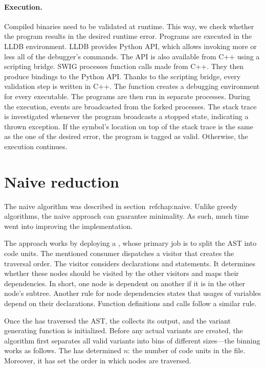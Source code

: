 \paragraph{Execution.} Compiled binaries need to be validated at runtime.
This way, we check whether the program results in the desired runtime error.
Programs are executed in the LLDB environment.
LLDB provides Python API, which allows invoking more or less all of 
the debugger's commands.
The API is also available from C++ using a scripting bridge.
SWIG processes function calls made from C++.
They then produce bindings to the Python API.
Thanks to the scripting bridge, every validation step is written in C++.
The  function creates a debugging environment for every 
executable.
The programs are then run in separate processes.
During the execution, events are broadcasted from the forked processes.
The stack trace is investigated whenever the program broadcasts a stopped 
state, indicating a thrown exception.
If the symbol's location on top of the stack trace is the same as the one of 
the desired error, the program is tagged as valid.
Otherwise, the execution continues.

\section{Naive reduction}

The naive algorithm was described in section~ref{chap:naive}.
Unlike greedy algorithms, the naive approach can guarantee minimality.
As such, much time went into improving the implementation.

The approach works by deploying a , whose 
primary job is to split the AST into code units.
The mentioned consumer dispatches a visitor that creates the traversal order.
The visitor considers declarations and statements.
It determines whether these nodes should be visited by the other visitors and 
maps their dependencies.
In short, one node is dependent on another if it is in the other node's 
subtree.
Another rule for node dependencies states that usages of variables depend on 
their declarations.
Function definitions and calls follow a similar rule.

Once the  has traversed the AST, 
the  collects its output, and the 
variant generating function is initialized.
Before any actual variants are created, the algorithm first separates all 
valid variants into bins of different sizes—the binning works as follows.
The  has determined $n$: the number of 
code units in the file.
Moreover, it has set the order in which nodes are traversed.

